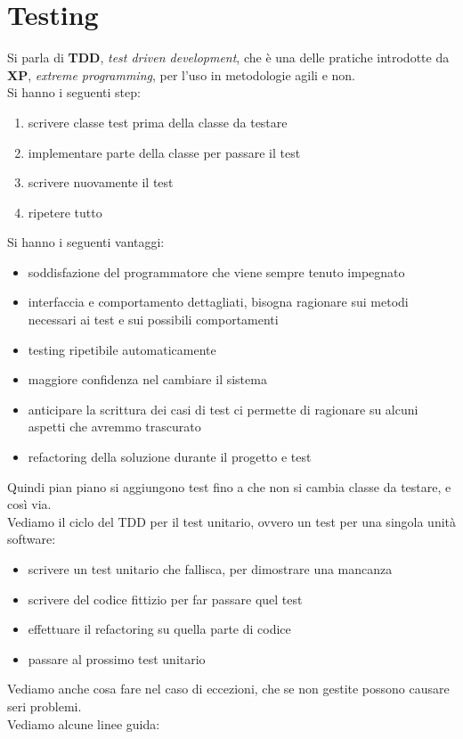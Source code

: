 \documentclass[a4paper,12pt, oneside]{book}
\begin{document}
\chapter{Testing}
Si parla di \textbf{TDD}, \textit{test driven development}, che è una delle pratiche introdotte da \textbf{XP}, \textit{extreme programming}, per l'uso in metodologie agili e non. \\
Si hanno i seguenti step:
\begin{enumerate}
\item scrivere classe test prima della classe da testare
\item implementare parte della classe per passare il test
\item scrivere nuovamente il test
\item ripetere tutto
\end{enumerate}
Si hanno i seguenti vantaggi:
\begin{itemize}
\item soddisfazione del programmatore che viene sempre tenuto impegnato
\item interfaccia e comportamento dettagliati, bisogna ragionare sui metodi necessari ai test e sui possibili
  comportamenti
\item testing ripetibile automaticamente
\item maggiore confidenza nel cambiare il sistema
\item anticipare la scrittura dei casi di test ci permette di ragionare su alcuni aspetti che avremmo trascurato
\item refactoring della soluzione durante il progetto e test
\end{itemize}
Quindi pian piano si aggiungono test fino a  che non si cambia classe da testare, e così via.\\
Vediamo il ciclo del TDD per il test unitario, ovvero un test per una singola unità software:
\begin{itemize}
\item scrivere un test unitario che fallisca, per dimostrare una mancanza
\item scrivere del codice fittizio per far passare quel test
\item effettuare il refactoring su quella parte di codice
\item passare al prossimo test unitario
\end{itemize}
Vediamo anche cosa fare nel caso di eccezioni, che se non gestite possono causare seri problemi.\\
Vediamo alcune linee guida:
\end{document}
